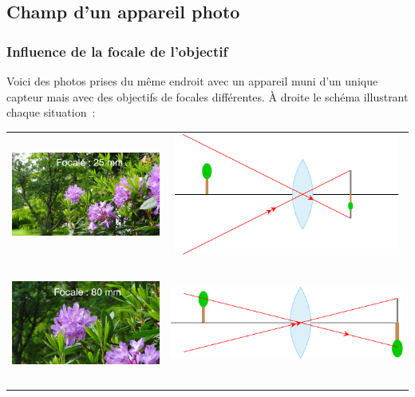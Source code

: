 \documentclass[../../main/main.tex]{subfiles}
\begin{document}
\subsection{Champ d'un appareil photo}


\subsubsection{Influence de la focale de l'objectif}

Voici des photos prises du même endroit avec un appareil muni d'un unique
capteur mais avec des objectifs de focales différentes. À droite le schéma
illustrant chaque situation~:

\begin{center}
	\begin{tabular}{cc}
		\includegraphics[height=4cm]{focale-25mm.png} &
		\includegraphics[height=4cm]{focale_obj-a}         \\
		\includegraphics[height=4cm]{focale-80mm.png} &
		\includegraphics[width=.5\linewidth]{focale_obj-b} \\
	\end{tabular}
\end{center}
\end{document}
